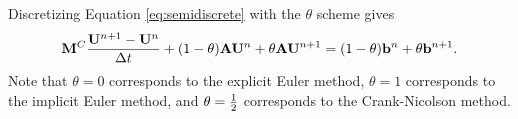 Discretizing Equation \eqref{eq:semidiscrete} with the $\theta$ scheme gives
\begin{equation}\label{eq:galerkin_theta}
  \mathbf{M}^C\frac{\mathbf{U}^{n+1}
  - \mathbf{U}^n}{\Delta t}
  + (1-\theta)\mathbf{A}\mathbf{U}^n
  + \theta\mathbf{A}\mathbf{U}^{n+1}
  = (1-\theta)\mathbf{b}^n + \theta\mathbf{b}^{n+1}.
\end{equation}
Note that $\theta=0$ corresponds to the explicit Euler method,
$\theta=1$ corresponds to the implicit Euler method, and $\theta=\frac{1}{2}$
corresponds to the Crank-Nicolson method.
